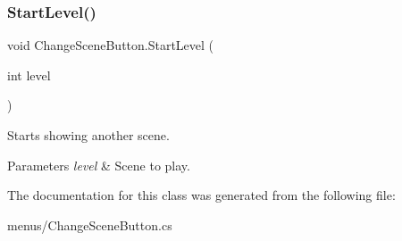 \subsubsection{\texorpdfstring{Start\+Level()}{StartLevel()}}
{\footnotesize\ttfamily void Change\+Scene\+Button.\+Start\+Level (\begin{DoxyParamCaption}\item[{int}]{level }\end{DoxyParamCaption})}



Starts showing another scene. 


\begin{DoxyParams}{Parameters}
{\em level} & Scene to play.\\
\hline
\end{DoxyParams}


The documentation for this class was generated from the following file\+:\begin{DoxyCompactItemize}
\item 
menus/Change\+Scene\+Button.\+cs\end{DoxyCompactItemize}
